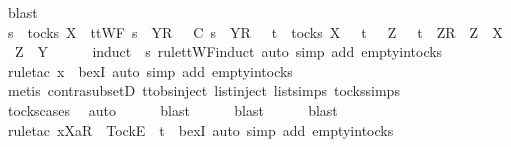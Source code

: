 \ blast\isanewline
\ \ \isamarkupfalse%
\ \isamarkupfalse%
\ {\isachardoublequoteopen}s\ {\isasymin}\ tocks\ X\ {\isasymlongrightarrow}\ ttWF\ {\isacharparenleft}s\ {\isacharat}\ {\isacharbrackleft}{\isacharbrackleft}Y{\isacharbrackright}\isactrlsub R{\isacharbrackright}{\isacharparenright}\ {\isasymlongrightarrow}\ {\isasymrho}\ {\isasymlesssim}\isactrlsub C\ s\ {\isacharat}\ {\isacharbrackleft}{\isacharbrackleft}Y{\isacharbrackright}\isactrlsub R{\isacharbrackright}\ {\isasymlongrightarrow}\ {\isacharparenleft}{\isasymexists}\ t\ {\isasymin}\ tocks\ X{\isachardot}\ {\isasymrho}\ {\isacharequal}\ t\ {\isasymor}\ {\isacharparenleft}{\isasymexists}\ Z{\isachardot}\ {\isasymrho}\ {\isacharequal}\ t\ {\isacharat}\ {\isacharbrackleft}{\isacharbrackleft}Z{\isacharbrackright}\isactrlsub R{\isacharbrackright}\ {\isasymand}\ {\isacharparenleft}Z\ {\isasymsubseteq}\ X\ {\isasymor}\ Z\ {\isasymsubseteq}\ Y{\isacharparenright}{\isacharparenright}{\isacharparenright}{\isachardoublequoteclose}\isanewline
\ \ \ \ \isamarkupfalse%
\ {\isacharparenleft}induct\ {\isasymrho}\ s\ rule{\isacharcolon}ttWF{}{\isachardot}induct{\isacharcomma}\ auto\ simp\ add{\isacharcolon}\ empty{\isacharunderscore}in{\isacharunderscore}tocks{\isacharparenright}\isanewline
\ \ \ \ \isamarkupfalse%
\ {\isacharparenleft}rule{\isacharunderscore}tac\ x{\isacharequal}{\isachardoublequoteopen}{\isacharbrackleft}{\isacharbrackright}{\isachardoublequoteclose}\ \ bexI{\isacharcomma}\ auto\ simp\ add{\isacharcolon}\ empty{\isacharunderscore}in{\isacharunderscore}tocks{\isacharparenright}\isanewline
\ \ \ \ \isamarkupfalse%
\ {\isacharparenleft}metis\ contra{\isacharunderscore}subsetD\ ttobs{\isachardot}inject{\isacharparenleft}{}{\isacharparenright}\ list{\isachardot}inject\ list{\isachardot}simps{\isacharparenleft}{}{\isacharparenright}\ tocks{\isachardot}simps{\isacharparenright}\isanewline
\ \ \ \ \isamarkupfalse%
\ tocks{\isachardot}cases\ \isamarkupfalse%
\ auto\isanewline
\ \ \ \ \isamarkupfalse%
\ blast\isanewline
\ \ \ \ \isamarkupfalse%
\ blast\isanewline
\ \ \ \ \isamarkupfalse%
\ blast\isanewline
\ \ \ \ \isamarkupfalse%
\ {\isacharparenleft}rule{\isacharunderscore}tac\ x{\isacharequal}{\isachardoublequoteopen}{\isacharbrackleft}Xa{\isacharbrackright}\isactrlsub R\ {\isacharhash}\ {\isacharbrackleft}Tock{\isacharbrackright}\isactrlsub E\ {\isacharhash}\ t{\isachardoublequoteclose}\ \ bexI{\isacharcomma}\ auto\ simp\ add{\isacharcolon}\ empty{\isacharunderscore}in{\isacharunderscore}tocks{\isacharparenright}\isanewline
